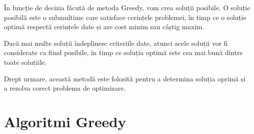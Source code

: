 \vspace{0.5cm}
În funcție de decizia făcută de metoda Greedy, vom crea soluții posibile. O soluție posibilă este o submultime care satisface cerințele problemei, în timp ce o soluție optimă respectă cerințele date și are cost minim sau câștig maxim.
\par 
Dacă mai multe soluții îndeplinesc criteriile date, atunci acele soluții vor fi considerate ca fiind posibile, în timp ce soluția optimă este cea mai bună dintre toate soluțiile.
\par 
Drept urmare, această metodă este folosită pentru a determina
soluția oprimă și a rezolva corect problema de optimizare.


\section{Algoritmi Greedy}
